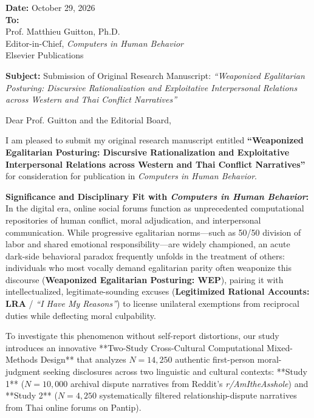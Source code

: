 \documentclass[11pt,a4paper]{article}
\begin{document}
\noindent \textbf{Date:} October 29, 2026\\[1.5ex]
\textbf{To:}\\
Prof. Matthieu Guitton, Ph.D.\\
Editor-in-Chief, \textit{Computers in Human Behavior}\\
Elsevier Publications

\vspace{2ex}
\noindent \textbf{Subject:} Submission of Original Research Manuscript: \textit{``Weaponized Egalitarian Posturing: Discursive Rationalization and Exploitative Interpersonal Relations across Western and Thai Conflict Narratives''}

\vspace{2ex}
\noindent Dear Prof. Guitton and the Editorial Board,

\vspace{1ex}
\noindent I am pleased to submit my original research manuscript entitled \textbf{``Weaponized Egalitarian Posturing: Discursive Rationalization and Exploitative Interpersonal Relations across Western and Thai Conflict Narratives''} for consideration for publication in \textit{Computers in Human Behavior}.

\vspace{1.5ex}
\noindent \textbf{Significance and Disciplinary Fit with \textit{Computers in Human Behavior}:}\\
In the digital era, online social forums function as unprecedented computational repositories of human conflict, moral adjudication, and interpersonal communication. While progressive egalitarian norms—such as 50/50 division of labor and shared emotional responsibility—are widely championed, an acute dark-side behavioral paradox frequently unfolds in the treatment of others: individuals who most vocally demand egalitarian parity often weaponize this discourse (\textbf{Weaponized Egalitarian Posturing: WEP}), pairing it with intellectualized, legitimate-sounding excuses (\textbf{Legitimized Rational Accounts: LRA} / \textit{``I Have My Reasons''}) to license unilateral exemptions from reciprocal duties while deflecting moral culpability.

To investigate this phenomenon without self-report distortions, our study introduces an innovative **Two-Study Cross-Cultural Computational Mixed-Methods Design** that analyzes $N = 14,250$ authentic first-person moral-judgment seeking disclosures across two linguistic and cultural contexts: **Study 1** ($N = 10,000$ archival dispute narratives from Reddit's \textit{r/AmItheAsshole}) and **Study 2** ($N = 4,250$ systematically filtered relationship-dispute narratives from Thai online forums on Pantip).
\end{document}
